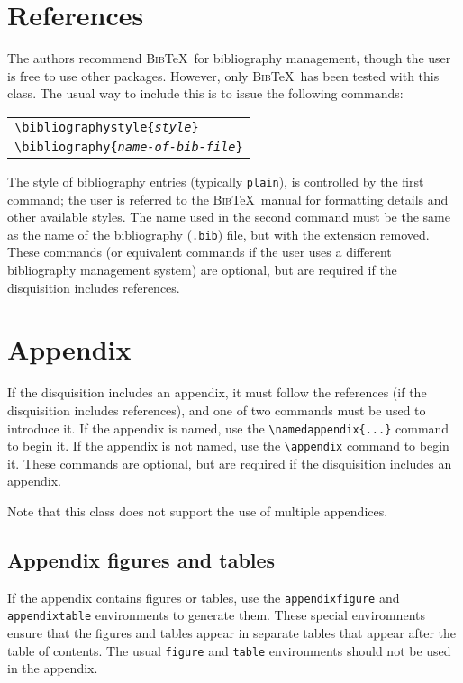 \documentclass{article}
\begin{document}
\section{References}
The authors recommend \textsc{Bib}\TeX\ for bibliography management, though the user is free to use other packages. However, only \textsc{Bib}\TeX\ has been tested with this class. The usual way to include this is to issue the following commands:
\begin{center}
\begin{tabular}{l}
\texttt{\textbackslash bibliographystyle\{\textit{style}\}} \\
\texttt{\textbackslash bibliography\{\textit{name-of-bib-file}\}}
\end{tabular}
\end{center}
The style of bibliography entries (typically \texttt{plain}), is controlled by the first command; the user is referred to the \textsc{Bib}\TeX\ manual for formatting details and other available styles. The name used in the second command must be the same as the name of the bibliography (\texttt{.bib}) file, but with the extension removed. These commands (or equivalent commands if the user uses a different bibliography management system) are optional, but are required if the disquisition includes references.

\section{Appendix}
If the disquisition includes an appendix, it must follow the references (if the disquisition includes references), and one of two commands must be used to introduce it. If the appendix is named, use the \texttt{\textbackslash namedappendix\{...\}} command to begin it. If the appendix is not named, use the \texttt{\textbackslash appendix} command to begin it. These commands are optional, but are required if the disquisition includes an appendix.

Note that this class does not support the use of multiple appendices.

\subsection{Appendix figures and tables}
If the appendix contains figures or tables, use the \texttt{appendixfigure} and \texttt{appendixtable} environments to generate them. These special environments ensure that the figures and tables appear in separate tables that appear after the table of contents. The usual \texttt{figure} and \texttt{table} environments should not be used in the appendix.
\end{document}
